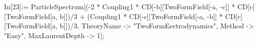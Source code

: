 In[23]:= ParticleSpectrum[(-2 * Coupling1 * CD[-b][TwoFormField[-a, -c]] * CD[c][TwoFormField[a, b]])/3 + (Coupling1 * CD[-c][TwoFormField[-a, -b]] * CD[c][TwoFormField[a, b]])/3, TheoryName -> "TwoFormEectrodynamics", Method -> "Easy", MaxLaurentDepth -> 1]; 